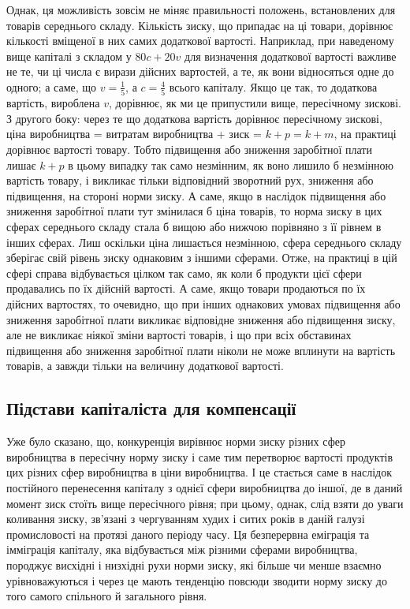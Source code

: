 Однак, ця можливість зовсім не міняє правильності положень, встановлених для товарів
середнього складу. Кількість зиску, що припадає на ці товари, дорівнює кількості вміщеної в них
самих додаткової вартості. Наприклад, при наведеному вище капіталі з складом у $80 c + 20 v$ для
визначення додаткової вартості важливе не те, чи ці числа є вирази дійсних вартостей, а те, як вони
відносяться одне до одного; а саме, що $v = \frac{1}{5}$, а $c = \frac{4}{5}$  всього капіталу. Якщо це так, то
додаткова вартість, вироблена $v$, дорівнює, як ми це припустили вище, пересічному зискові. З другого
боку: через те що додаткова вартість дорівнює пересічному зискові, ціна виробництва = витратам
виробництва + зиск = $k + p = k + m$, на практиці дорівнює вартості товару. Тобто підвищення або
зниження заробітної плати лишає $k + p$  в цьому випадку так само незмінним, як воно лишило б
незмінною вартість товару, і викликає тільки відповідний зворотний рух,
зниження або підвищення, на стороні норми зиску. А саме, якщо в наслідок підвищення або зниження
заробітної плати тут змінилася б ціна товарів, то норма зиску в цих сферах середнього складу стала б
вищою або нижчою порівняно з її рівнем в інших
сферах. Лиш оскільки ціна лишається незмінною, сфера
середнього складу зберігає свій рівень зиску однаковим з іншими сферами. Отже, на практиці в цій
сфері справа відбувається цілком так само, як коли б продукти цієї сфери продавались по їх дійсній
вартості. А саме, якщо товари продаються по їх дійсних вартостях, то очевидно, що при інших
однакових умовах підвищення або зниження заробітної плати викликає відповідне зниження або підвищення зиску,
але не викликає ніякої зміни вартості товарів, і що при всіх обставинах підвищення або зниження
заробітної плати ніколи не може вплинути на вартість товарів, а завжди тільки на величину додаткової
вартості.

\subsection{Підстави капіталіста для компенсації}

Уже було сказано, що, конкуренція вирівнює норми зиску різних сфер виробництва в пересічну норму
зиску і саме тим перетворює вартості продуктів цих різних сфер виробництва в ціни виробництва. І це
стається саме в наслідок постійного перенесення капіталу з однієї сфери виробництва до іншої, де в
даний момент зиск стоїть вище пересічного рівня; при цьому, однак, слід взяти до уваги коливання
зиску, зв’язані з чергуванням худих і ситих років в даній галузі промисловості на протязі даного
періоду часу. Ця безперервна еміграція та імміграція капіталу, яка відбувається між різними сферами
виробництва, породжує висхідні і низхідні рухи норми зиску, які більше чи менше взаємно
урівноважуються і через це мають тенденцію повсюди зводити норму зиску до того самого спільного й загального рівня.

